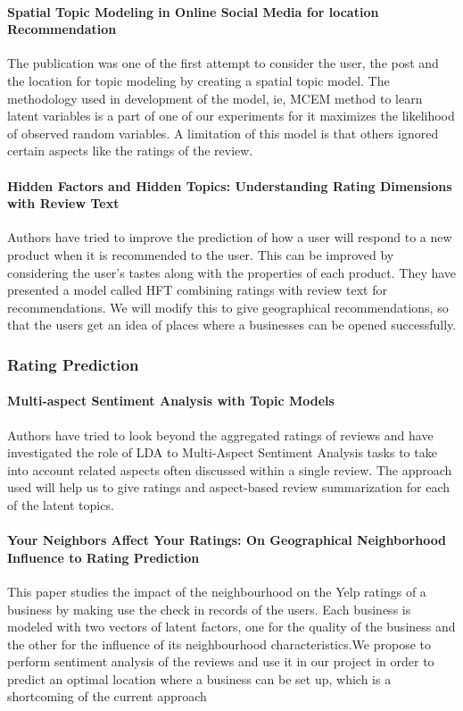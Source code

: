 \documentclass[12pt]{article} %
\begin{document}
\paragraph{Spatial Topic Modeling in Online Social Media for location Recommendation}
The publication was one of the first attempt to consider the user, the post and the location for topic modeling by creating a spatial topic model. The methodology used in development of the model, ie, MCEM method to learn latent variables is a part of one of our experiments for it maximizes the likelihood of observed random variables. A limitation of this model is that others ignored certain aspects like the ratings of the review.

\paragraph{Hidden Factors and Hidden Topics: Understanding Rating Dimensions with Review Text} 
Authors have tried to improve the prediction of how a user will respond to a new product when it is recommended to the user. This can be improved by considering the user's tastes along with the properties of each product. They have presented a model called HFT combining ratings with review text for recommendations. We will modify this to give geographical recommendations, so that the users get an idea of places where a businesses can be opened successfully. 

\subsubsection{Rating Prediction}

\paragraph{Multi-aspect Sentiment Analysis with Topic Models}
Authors have tried to look beyond the aggregated ratings of reviews and have investigated the role of LDA to Multi-Aspect Sentiment Analysis tasks to take into account related aspects often discussed within a single review. The approach used will help us to give ratings and aspect-based review summarization for each of the latent topics.

\paragraph{Your Neighbors Affect Your Ratings: On Geographical Neighborhood Influence to Rating Prediction}
This paper studies the impact of the neighbourhood on the Yelp ratings of a business by making use the check in records of the users. Each business is modeled with two vectors of latent factors, one for the quality of the business and the other for the influence of its neighbourhood characteristics.We propose to perform sentiment analysis of the reviews and use it in our project in order to predict an optimal location where a business can be set up, which is a shortcoming of the current approach
\end{document}
